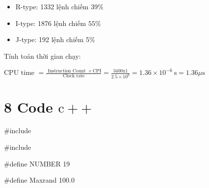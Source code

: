\documentclass[a4paper]{article}
\begin{document}
\begin{itemize}
  \item R-type: 1332 lệnh chiếm 39\%
  \item I-type: 1876 lệnh chiếm $55 \%$
  \item J-type: 192 lệnh chiếm 5\%
\end{itemize}

Tính toán thời gian chạy:

CPU time $=\frac{\text { Instruction Count } \times \mathrm{CPI}}{\text { Clock rate }}=\frac{3400 \mathrm{x} 1}{2.5 \times 10^{9}}=1.36 \times 10^{-6} \mathrm{~s}=1.36 \mu \mathrm{s}$

\section*{8 Code $\mathrm{c}++$}
\#include 

\#include 

\#define NUMBER 19

\#define Maxrand 100.0
\end{document}
